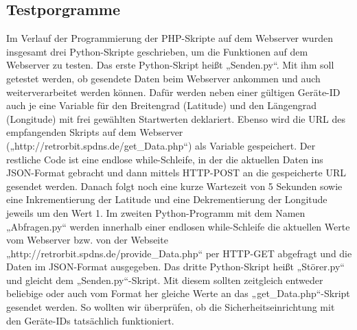 \subsection{Testporgramme}
Im Verlauf der Programmierung der PHP-Skripte auf dem Webserver wurden insgesamt drei Python-Skripte geschrieben, um die Funktionen auf dem Webserver zu testen.
Das erste Python-Skript heißt „Senden.py“. Mit ihm soll getestet werden, ob gesendete Daten beim Webserver ankommen und auch weiterverarbeitet werden können. Dafür werden neben einer gültigen Geräte-ID auch je eine Variable für den Breitengrad (Latitude) und den Längengrad (Longitude) mit frei gewählten Startwerten deklariert. Ebenso wird die URL des empfangenden Skripts auf dem Webserver („http://retrorbit.spdns.de/get\_Data.php“) als Variable gespeichert. Der restliche Code ist eine endlose while-Schleife, in der die aktuellen Daten ins JSON-Format gebracht und dann mittels HTTP-POST an die gespeicherte URL gesendet werden. Danach folgt noch eine kurze Wartezeit von 5 Sekunden sowie eine Inkrementierung der Latitude und eine Dekrementierung der Longitude jeweils um den Wert 1.
Im zweiten Python-Programm mit dem Namen „Abfragen.py“ werden innerhalb einer endlosen while-Schleife die aktuellen Werte vom Webserver bzw. von der Webseite „http://retrorbit.spdns.de/provide\_Data.php“ per HTTP-GET abgefragt und die Daten im JSON-Format ausgegeben.
Das dritte Python-Skript heißt „Störer.py“ und gleicht dem „Senden.py“-Skript. Mit diesem sollten zeitgleich entweder beliebige oder auch vom Format her gleiche Werte an das „get\_Data.php“-Skript gesendet werden. So wollten wir überprüfen, ob die Sicherheitseinrichtung mit den Geräte-IDs tatsächlich funktioniert.

